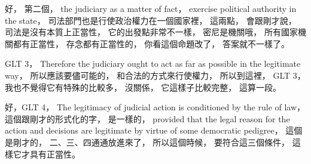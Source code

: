 \hypertarget{w02:cue:2525}{}好，
\hypertarget{w02:cue:2526}{}第二個，
\hypertarget{w02:cue:2527}{}the judiciary as a matter of fact，
\hypertarget{w02:cue:2528}{}exercise political authority in the state，
\hypertarget{w02:cue:2529}{}司法部門也是行使政治權力在一個國家裡，
\hypertarget{w02:cue:2530}{}這兩點，
\hypertarget{w02:cue:2531}{}會跟剛才說，
\hypertarget{w02:cue:2532}{}司法是沒有本質上正當性，
\hypertarget{w02:cue:2533}{}它的出發點非常不一樣，
\hypertarget{w02:cue:2534}{}密尼是機關哦，
\hypertarget{w02:cue:2535}{}所有國家機關都有正當性，
\hypertarget{w02:cue:2536}{}存念都有正當性的，
\hypertarget{w02:cue:2537}{}你看這個命題改了，
\hypertarget{w02:cue:2538}{}答案就不一樣了。

\hypertarget{w02:cue:2539}{}GLT 3，
\hypertarget{w02:cue:2540}{}Therefore the judiciary ought to act as far as possible in the legitimate way，
\hypertarget{w02:cue:2541}{}所以應該要儘可能的，
\hypertarget{w02:cue:2542}{}和合法的方式來行使權力，
\hypertarget{w02:cue:2543}{}所以到這裡，
\hypertarget{w02:cue:2544}{}GLT 3，
\hypertarget{w02:cue:2545}{}我也不覺得它有特殊的比較多，
\hypertarget{w02:cue:2546}{}沒關係，
\hypertarget{w02:cue:2547}{}它這樣子比較完整，
\hypertarget{w02:cue:2548}{}這算一段。

\hypertarget{w02:cue:2549}{}好，GLT 4，
\hypertarget{w02:cue:2550}{}The legitimacy of judicial action is conditioned by the rule of law，
\hypertarget{w02:cue:2551}{}這個跟剛才的形式化的字，
\hypertarget{w02:cue:2552}{}是一樣的，
\hypertarget{w02:cue:2553}{}provided that the legal reason for the action and decisions are legitimate by virtue of some democratic pedigree，
\hypertarget{w02:cue:2554}{}這個是剛才的，
\hypertarget{w02:cue:2555}{}二、三、四通通放進來了，
\hypertarget{w02:cue:2556}{}所以這個時候，
\hypertarget{w02:cue:2557}{}要符合這三個條件，
\hypertarget{w02:cue:2558}{}這樣它才具有正當性。

